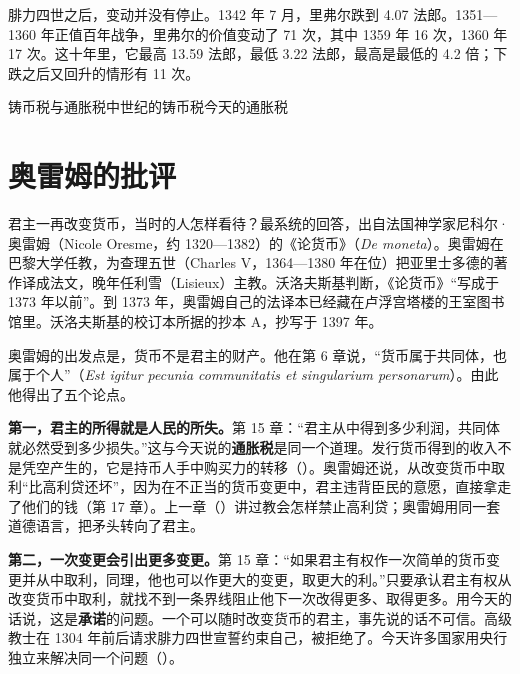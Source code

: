 腓力四世之后，变动并没有停止。1342 年 7 月，里弗尔跌到 4.07 法郎。1351—1360 年正值百年战争，里弗尔的价值变动了 71 次，其中 1359 年 16 次，1360 年 17 次。这十年里，它最高 13.59 法郎，最低 3.22 法郎，最高是最低的 4.2 倍；下跌之后又回升的情形有 11 次\cite{wailly1857}。

\begin{compare}{铸币税与通胀税}{中世纪的铸币税}{今天的通胀税}
\end{compare}

\section{奥雷姆的批评}\label{sec:medieval-oresme}

君主一再改变货币，当时的人怎样看待？最系统的回答，出自法国神学家尼科尔·奥雷姆（Nicole Oresme，约 1320—1382）的《论货币》（\emph{De moneta}）。奥雷姆在巴黎大学任教，为查理五世（Charles V，1364—1380 年在位）把亚里士多德的著作译成法文，晚年任利雪（Lisieux）主教。沃洛夫斯基判断，《论货币》“写成于 1373 年以前”。到 1373 年，奥雷姆自己的法译本已经藏在卢浮宫塔楼的王室图书馆里\cite{oresme1864}。沃洛夫斯基的校订本所据的抄本 A，抄写于 1397 年。

奥雷姆的出发点是，货币不是君主的财产。他在第 6 章说，“货币属于共同体，也属于个人”（\emph{Est igitur pecunia communitatis et singularium personarum}）\cite{oresme1864}。由此他得出了五个论点。

\textbf{第一，君主的所得就是人民的所失。}第 15 章：“君主从中得到多少利润，共同体就必然受到多少损失。”这与今天说的\textbf{通胀税}是同一个道理。发行货币得到的收入不是凭空产生的，它是持币人手中购买力的转移（）。奥雷姆还说，从改变货币中取利“比高利贷还坏”，因为在不正当的货币变更中，君主违背臣民的意愿，直接拿走了他们的钱（第 17 章）\cite{oresme1864}。上一章（）讲过教会怎样禁止高利贷；奥雷姆用同一套道德语言，把矛头转向了君主。

\textbf{第二，一次变更会引出更多变更。}第 15 章：“如果君主有权作一次简单的货币变更并从中取利，同理，他也可以作更大的变更，取更大的利。”\cite{oresme1864}只要承认君主有权从改变货币中取利，就找不到一条界线阻止他下一次改得更多、取得更多。用今天的话说，这是\textbf{承诺}的问题。一个可以随时改变货币的君主，事先说的话不可信。高级教士在 1304 年前后请求腓力四世宣誓约束自己，被拒绝了。今天许多国家用央行独立来解决同一个问题（）。

